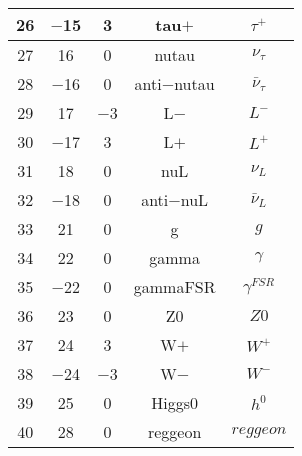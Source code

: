 \documentclass{article}
\begin{document}
\begin{table}[!htbp]
\begin{tabular}{|c|c|c|c|c|}
\hline
26 & $-$15 & 3 & tau$+$ & $\tau^{+}$ \\
\hline
27 & 16 & 0 & nu\underline{\hspace{0.6em}}tau & $\nu_{\tau}$ \\
\hline
28 & $-$16 & 0 & anti$-$nu\underline{\hspace{0.6em}}tau & $\bar{\nu}_{\tau}$ \\
\hline
29 & 17 & $-$3 & L$-$ & $L^{-}$ \\
\hline
30 & $-$17 & 3 & L$+$ & $L^{+}$ \\
\hline
31 & 18 & 0 & nu\underline{\hspace{0.6em}}L & $\nu_{L}$ \\
\hline
32 & $-$18 & 0 & anti$-$nu\underline{\hspace{0.6em}}L & $\bar{\nu}_{L}$ \\
\hline
33 & 21 & 0 & g & $g$ \\
\hline
34 & 22 & 0 & gamma & $\gamma$ \\
\hline
35 & $-$22 & 0 & gammaFSR & $\gamma^{FSR}$ \\
\hline
36 & 23 & 0 & Z0 & $Z0$ \\
\hline
37 & 24 & 3 & W$+$ & $W^{+}$ \\
\hline
38 & $-$24 & $-$3 & W$-$ & $W^{-}$ \\
\hline
39 & 25 & 0 & Higgs0 & $h^{0}$ \\
\hline
40 & 28 & 0 & reggeon & $reggeon$ \\
\hline
\end{tabular}
\end{table}

\clearpage
\end{document}
